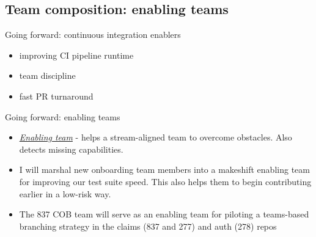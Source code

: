 \documentclass{beamer}
\begin{document}
	\subsection{Team composition: enabling teams}
	\begin{frame}{Going forward: continuous integration enablers}
		\begin{itemize}
			\item improving CI pipeline runtime \pause
			\item team discipline \pause
			\item fast PR turnaround \pause
		\end{itemize}
	\end{frame}	
	\begin{frame}{Going forward: enabling teams}
		\begin{itemize}
			\item \textit{\underline{Enabling team}} - helps a stream-aligned team to overcome obstacles. Also detects missing capabilities. \pause
			\item I will marshal new onboarding team members into a makeshift enabling team for improving our test suite speed. This also helps them to begin contributing earlier in a low-risk way. \pause
			\item The 837 COB team will serve as an enabling team for piloting a teams-based branching strategy in the claims (837 and 277) and auth (278) repos \pause
		\end{itemize}
	\end{frame}
\end{document}
